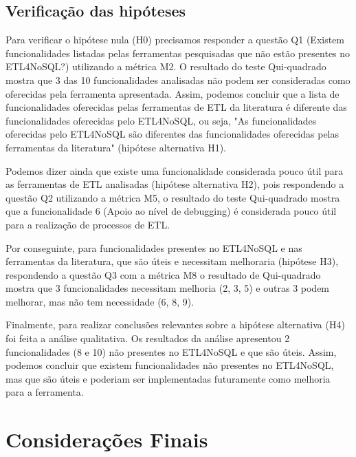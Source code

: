\subsection{Verificação das hipóteses}

Para verificar o hipótese nula (H0) precisamos responder a questão Q1  (Existem funcionalidades listadas pelas ferramentas pesquisadas que não estão presentes no ETL4NoSQL?) utilizando a métrica M2. O resultado do teste Qui-quadrado mostra que 3 das 10 funcionalidades analisadas não podem ser consideradas como oferecidas pela ferramenta apresentada. Assim, podemos concluir que a lista de funcionalidades oferecidas pelas ferramentas de ETL da literatura é diferente das funcionalidades oferecidas pelo ETL4NoSQL, ou seja, "As funcionalidades oferecidas pelo ETL4NoSQL são diferentes das funcionalidades oferecidas pelas ferramentas da literatura" (hipótese alternativa H1).

Podemos dizer ainda que existe uma funcionalidade considerada pouco útil para as ferramentas de ETL analisadas (hipótese alternativa H2), pois respondendo a questão Q2 utilizando a métrica M5, o resultado do teste Qui-quadrado mostra que a funcionalidade 6 (Apoio ao nível de debugging) é considerada pouco útil para a realização de processos de ETL.

Por conseguinte, para funcionalidades presentes no ETL4NoSQL e nas ferramentas da literatura, que são úteis e necessitam melhoraria (hipótese H3), respondendo a questão Q3 com a métrica M8 o resultado de Qui-quadrado mostra que 3 funcionalidades necessitam melhoria (2, 3, 5) e outras 3 podem melhorar, mas não tem necessidade (6, 8, 9).

Finalmente, para realizar conclusões relevantes sobre a hipótese alternativa (H4) foi feita a análise qualitativa. Os resultados da análise apresentou 2 funcionalidades (8 e 10) não presentes no ETL4NoSQL e que são úteis. Assim, podemos concluir que existem funcionalidades não presentes no ETL4NoSQL, mas que são úteis e poderiam ser implementadas futuramente como melhoria para a ferramenta.



\section{Considerações Finais}


